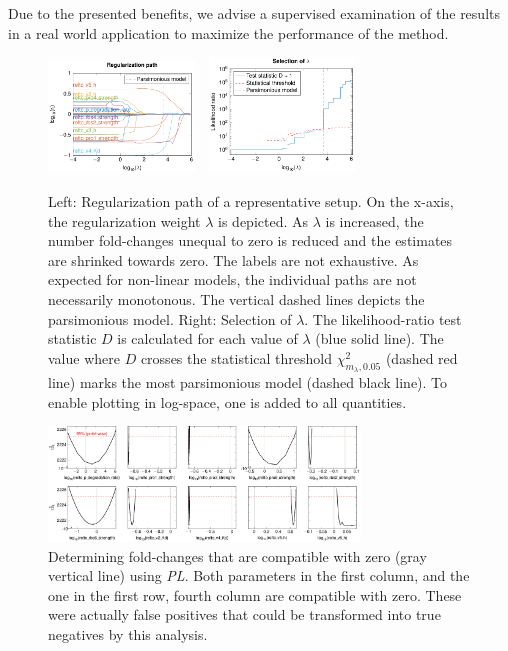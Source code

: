 \documentclass{bioinfo}
\begin{document}
Due to the presented benefits, we advise a supervised examination of the results in a real world application to maximize the performance of the method.

\begin{figure}[!tpb]%
\centerline{\includegraphics[width=110pt]{Figures/l1_tree.pdf}~~\includegraphics[width=110pt]{Figures/l1_selection.pdf}}
\caption{Left: Regularization path of a representative setup. On the x-axis, the regularization weight $\lambda$ is depicted. As $\lambda$ is increased, the number fold-changes unequal to zero is reduced and the estimates are shrinked towards zero. The labels are not exhaustive. As expected for non-linear models, the individual paths are not necessarily monotonous. The vertical dashed lines depicts the parsimonious model. Right: Selection of $\lambda$. The likelihood-ratio test statistic $D$ is calculated for each value of $\lambda$ (blue solid line). The value where $D$ crosses the statistical threshold $\chi^2_{m_\lambda,0.05}$ (dashed red line) marks the most parsimonious model (dashed black line). To enable plotting in log-space, one is added to all quantities.}\label{fig:05}
\end{figure}

\begin{figure}[!tpb]%
\centerline{\includegraphics[width=235pt]{Figures/multi_plot.pdf}}
\caption{Determining fold-changes that are compatible with zero (gray vertical line) using \emph{PL}. Both parameters in the first column, and the one in the first row, fourth column are compatible with zero. These were actually false positives that could be transformed into true negatives by this analysis.}\label{fig:06}
\end{figure}
\end{document}
